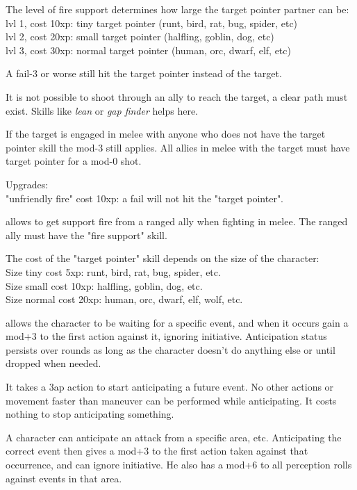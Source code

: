 The level of fire support determines how large the target pointer partner can be:\\
lvl 1, cost 10xp: tiny target pointer (runt, bird, rat, bug, spider, etc) \\
lvl 2, cost 20xp: small target pointer (halfling, goblin, dog, etc) \\
lvl 3, cost 30xp: normal target pointer (human, orc, dwarf, elf, etc)

A fail-3 or worse still hit the target pointer instead of the target.

It is not possible to shoot through an ally to reach the target, a clear path must exist. Skills like \emph{lean} or \emph{gap finder} helps here.

If the target is engaged in melee with anyone who does not have the target pointer skill the mod-3 still applies. All allies in melee with the target must have target pointer for a mod-0 shot.

Upgrades: \\
"unfriendly fire" cost 10xp: a fail will not hit the "target pointer".


 allows to get support fire from a ranged ally when fighting in melee. The ranged ally must have the "fire support" skill.

The cost of the "target pointer" skill depends on the size of the character: \\
Size tiny cost 5xp: runt, bird, rat, bug, spider, etc. \\
Size small cost 10xp: halfling, goblin, dog, etc. \\
Size normal cost 20xp: human, orc, dwarf, elf, wolf, etc.


 allows the character to be waiting for a specific event, and when it occurs gain a mod+3 to the first action against it, ignoring initiative. Anticipation status persists over rounds as long as the character doesn't do anything else or until dropped when needed.

It takes a 3ap action to start anticipating a future event. No other actions or movement faster than maneuver can be performed while anticipating. It costs nothing to stop anticipating something.

A character can anticipate an attack from a specific area, etc. Anticipating the correct event then gives a mod+3 to the first action taken against that occurrence, and can ignore initiative. He also has a mod+6 to all perception rolls against events in that area.

